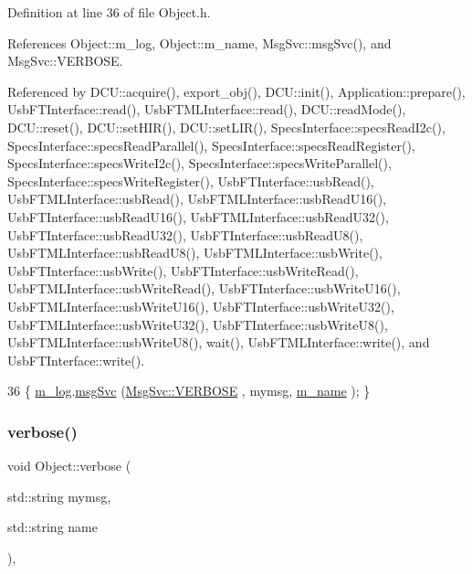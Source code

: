 Definition at line 36 of file Object.\+h.



References Object\+::m\+\_\+log, Object\+::m\+\_\+name, Msg\+Svc\+::msg\+Svc(), and Msg\+Svc\+::\+V\+E\+R\+B\+O\+SE.



Referenced by D\+C\+U\+::acquire(), export\+\_\+obj(), D\+C\+U\+::init(), Application\+::prepare(), Usb\+F\+T\+Interface\+::read(), Usb\+F\+T\+M\+L\+Interface\+::read(), D\+C\+U\+::read\+Mode(), D\+C\+U\+::reset(), D\+C\+U\+::set\+H\+I\+R(), D\+C\+U\+::set\+L\+I\+R(), Specs\+Interface\+::specs\+Read\+I2c(), Specs\+Interface\+::specs\+Read\+Parallel(), Specs\+Interface\+::specs\+Read\+Register(), Specs\+Interface\+::specs\+Write\+I2c(), Specs\+Interface\+::specs\+Write\+Parallel(), Specs\+Interface\+::specs\+Write\+Register(), Usb\+F\+T\+Interface\+::usb\+Read(), Usb\+F\+T\+M\+L\+Interface\+::usb\+Read(), Usb\+F\+T\+M\+L\+Interface\+::usb\+Read\+U16(), Usb\+F\+T\+Interface\+::usb\+Read\+U16(), Usb\+F\+T\+M\+L\+Interface\+::usb\+Read\+U32(), Usb\+F\+T\+Interface\+::usb\+Read\+U32(), Usb\+F\+T\+Interface\+::usb\+Read\+U8(), Usb\+F\+T\+M\+L\+Interface\+::usb\+Read\+U8(), Usb\+F\+T\+M\+L\+Interface\+::usb\+Write(), Usb\+F\+T\+Interface\+::usb\+Write(), Usb\+F\+T\+Interface\+::usb\+Write\+Read(), Usb\+F\+T\+M\+L\+Interface\+::usb\+Write\+Read(), Usb\+F\+T\+Interface\+::usb\+Write\+U16(), Usb\+F\+T\+M\+L\+Interface\+::usb\+Write\+U16(), Usb\+F\+T\+Interface\+::usb\+Write\+U32(), Usb\+F\+T\+M\+L\+Interface\+::usb\+Write\+U32(), Usb\+F\+T\+Interface\+::usb\+Write\+U8(), Usb\+F\+T\+M\+L\+Interface\+::usb\+Write\+U8(), wait(), Usb\+F\+T\+M\+L\+Interface\+::write(), and Usb\+F\+T\+Interface\+::write().


\begin{DoxyCode}
36 \{ \hyperlink{classObject_a0d269813dd7ac1f24bc143031e2963f2}{m\_log}.\hyperlink{classMsgSvc_ad25f18047920cc59a314e5098259711c}{msgSvc} (\hyperlink{classMsgSvc_ae671eb7301996cd049d2da8a65925926af655256b06494ade5ba830abe5401ec9}{MsgSvc::VERBOSE} , mymsg, \hyperlink{classObject_a8b83c95c705d2c3ba0d081fe1710f48d}{m\_name} ); \}
\end{DoxyCode}
\mbox{\label{classObject_a2d4120195317e2a3c6532e8bb9f3da68}} 
\subsubsection{\texorpdfstring{verbose()}{verbose()}\hspace{0.1cm}{\footnotesize\ttfamily [2/2]}}
{\footnotesize\ttfamily void Object\+::verbose (\begin{DoxyParamCaption}\item[{std\+::string}]{mymsg,  }\item[{std\+::string}]{name }\end{DoxyParamCaption})\hspace{0.3cm}{\ttfamily [inline]}, {\ttfamily [inherited]}}



